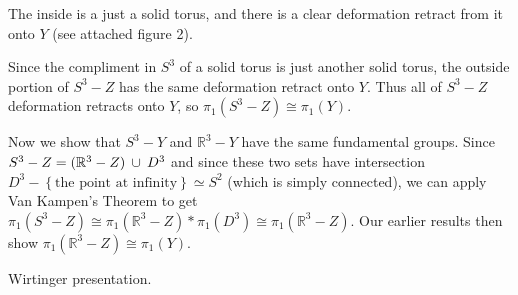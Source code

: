 \documentclass[twoside,10pt]{article}
\begin{document}
\begin{enumerate}
		The inside is a just a solid torus, and there is a clear deformation retract from it onto $Y$ (see attached figure 2).

		Since the compliment in $S^{3}$ of a solid torus is just another solid torus, the outside portion of $S^{3}-Z$ has the same deformation retract onto $Y$. Thus all of $S^{3}-Z$ deformation retracts onto $Y$, so $\pi_1(S^{3}-Z) \cong \pi_1(Y)$.

		Now we show that $S^{3}-Y$ and $\mathbb{R}^{3}-Y$ have the same fundamental groups. Since $S^{3}-Z = (\mathbb{R}^{3}-Z) \operatorname{\;\cup\;} D^{3}$ and since these two sets have intersection $D^{3}- \left\{ \text{the point at infinity} \right\} \simeq S^{2}$ (which is simply connected), we can apply Van Kampen's Theorem to get $\pi_1(S^{3}-Z) \cong \pi_1(\mathbb{R}^{3}-Z) * \pi_1(D^{3}) \cong  \pi_1(\mathbb{R}^{3}-Z)$. Our earlier results then show $\pi_1(\mathbb{R}^{3}-Z) \cong \pi_1(Y)$.
\end{enumerate}

\newpage

\begin{exer}[1.2: 22]
Wirtinger presentation.
\end{exer}
\end{document}
